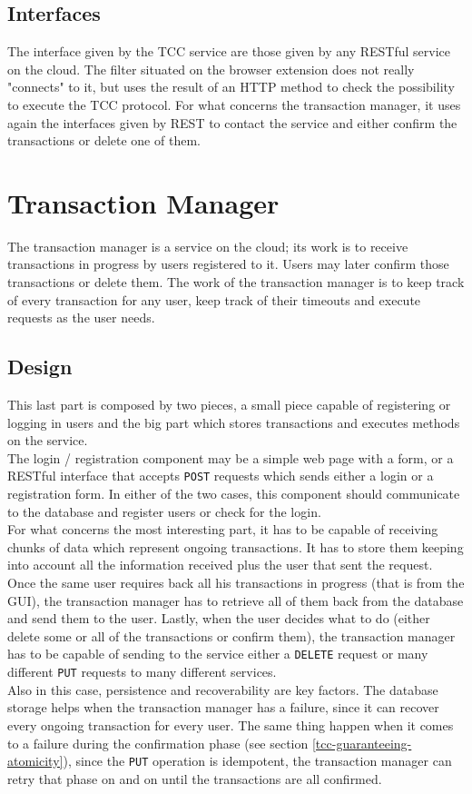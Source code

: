 \subsection{Interfaces}
The interface given by the TCC service are those given by any RESTful service on the cloud. The filter situated on the browser extension does not really "connects" to it, but uses the result of an HTTP method to check the possibility to execute the TCC protocol. For what concerns the transaction manager, it uses again the interfaces given by REST to contact the service and either confirm the transactions or delete one of them.

\section{Transaction Manager} 
The transaction manager is a service on the cloud; its work is to receive transactions in progress by users registered to it. Users may later confirm those transactions or delete them. The work of the transaction manager is to keep track of every transaction for any user, keep track of their timeouts and execute requests as the user needs. 

\subsection{Design}
This last part is composed by two pieces, a small piece capable of registering or logging in users and the big part which stores transactions and executes methods on the service.\\
The login / registration component may be a simple web page with a form, or a RESTful interface that accepts {\tt POST} requests which sends either a login or a registration form. In either of the two cases, this component should communicate to the database and register users or check for the login.\\
For what concerns the most interesting part, it has to be capable of receiving chunks of data which represent ongoing transactions. It has to store them keeping into account all the information received plus the user that sent the request. Once the same user requires back all his transactions in progress (that is from the GUI), the transaction manager has to retrieve all of them back from the database and send them to the user. Lastly, when the user decides what to do (either delete some or all of the transactions or confirm them), the transaction manager has to be capable of sending to the service either a {\tt DELETE} request or many different {\tt PUT} requests to many different services.\\
Also in this case, persistence and recoverability are key factors. The database storage helps when the transaction manager has a failure, since it can recover every ongoing transaction for every user. The same thing happen when it comes to a failure during the confirmation phase (see section \ref{tcc-guaranteeing-atomicity}), since the {\tt PUT} operation is idempotent, the transaction manager can retry that phase on and on until the transactions are all confirmed.
